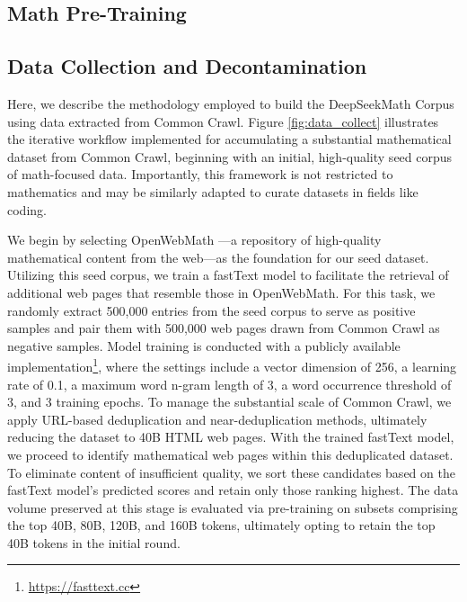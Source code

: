 \begin{itemize}[topsep=0pt]
\section{Math Pre-Training}

\subsection{Data Collection and Decontamination} 

Here, we describe the methodology employed to build the DeepSeekMath Corpus using data extracted from Common Crawl. Figure \ref{fig:data_collect} illustrates the iterative workflow implemented for accumulating a substantial mathematical dataset from Common Crawl, beginning with an initial, high-quality seed corpus of math-focused data. Importantly, this framework is not restricted to mathematics and may be similarly adapted to curate datasets in fields like coding.

We begin by selecting OpenWebMath \citep{openwebmath}—a repository of high-quality mathematical content from the web—as the foundation for our seed dataset. Utilizing this seed corpus, we train a fastText model \citep{joulin2016fasttext} to facilitate the retrieval of additional web pages that resemble those in OpenWebMath. For this task, we randomly extract 500,000 entries from the seed corpus to serve as positive samples and pair them with 500,000 web pages drawn from Common Crawl as negative samples. Model training is conducted with a publicly available implementation\footnote{\url{https://fasttext.cc}}, where the settings include a vector dimension of 256, a learning rate of 0.1, a maximum word n-gram length of 3, a word occurrence threshold of 3, and 3 training epochs. To manage the substantial scale of Common Crawl, we apply URL-based deduplication and near-deduplication methods, ultimately reducing the dataset to 40B HTML web pages. With the trained fastText model, we proceed to identify mathematical web pages within this deduplicated dataset. To eliminate content of insufficient quality, we sort these candidates based on the fastText model’s predicted scores and retain only those ranking highest. The data volume preserved at this stage is evaluated via pre-training on subsets comprising the top 40B, 80B, 120B, and 160B tokens, ultimately opting to retain the top 40B tokens in the initial round.


\end{itemize}
